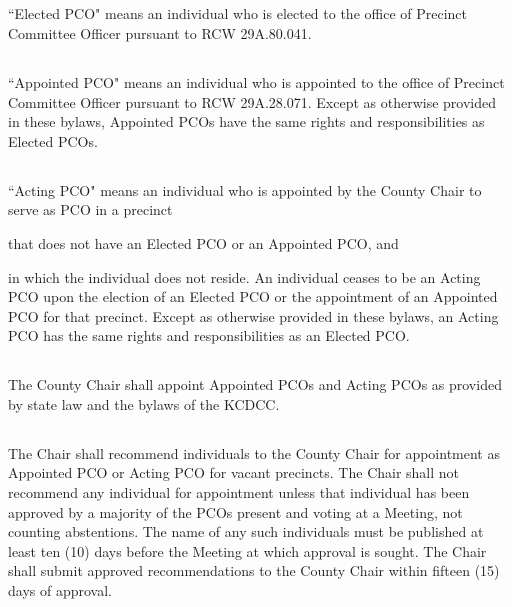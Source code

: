 \subsection{} \label{elected-pco}
``Elected PCO" means an individual who is elected to the office of Precinct Committee Officer pursuant to RCW 29A.80.041.

\subsection{}
``Appointed PCO" means an individual who is appointed to the office of Precinct Committee Officer pursuant to RCW 29A.28.071. Except as otherwise provided in these bylaws, Appointed PCOs have the same rights and responsibilities as Elected PCOs.

\subsection{} \label{acting-pco}
``Acting PCO" means an individual who is appointed by the County Chair to serve as PCO in a precinct
\begin{inlinealphalist}
    \item that does not have an Elected PCO or an Appointed PCO, and
    \item in which the individual does not reside. An individual ceases to be an Acting PCO upon the election of an Elected PCO or the appointment of an Appointed PCO for that precinct. Except as otherwise provided in these bylaws, an Acting PCO has the same rights and responsibilities as an Elected PCO.
\end{inlinealphalist}

\subsection{}
The County Chair shall appoint Appointed PCOs and Acting PCOs as provided by state law and the bylaws of the KCDCC.

\subsection{}
The Chair shall recommend individuals to the County Chair for appointment as Appointed PCO or Acting PCO for vacant precincts. The Chair shall not recommend any individual for appointment unless that individual has been approved by a majority of the PCOs present and voting at a Meeting, not counting abstentions. The name of any such individuals must be published at least ten (10) days before the Meeting at which approval is sought. The Chair shall submit approved recommendations to the County Chair within fifteen (15) days of approval.


